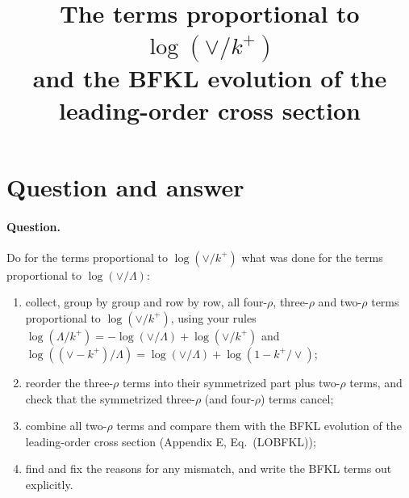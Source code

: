 \documentclass[10pt]{article}
\title{The terms proportional to $\log(\vee/k^+)$\\[2pt] \large and the BFKL evolution of the leading-order cross section}
\date{}
\numberwithin{equation}{section}
\begin{document}
\maketitle
\tableofcontents

\section{Question and answer}\label{sec:answer}

\paragraph{Question.} Do for the terms proportional to $\log(\vee/k^+)$ what was done for the terms proportional to $\log(\vee/\Lambda)$:
\begin{enumerate}
\item collect, group by group and row by row, all four-$\rho$, three-$\rho$ and two-$\rho$ terms proportional to $\log(\vee/k^+)$, using your rules $\log(\Lambda/k^+)=-\log(\vee/\Lambda)+\log(\vee/k^+)$ and $\log((\vee-k^+)/\Lambda)=\log(\vee/\Lambda)+\log(1-k^+/\vee)$;
\item reorder the three-$\rho$ terms into their symmetrized part plus two-$\rho$ terms, and check that the symmetrized three-$\rho$ (and four-$\rho$) terms cancel;
\item combine all two-$\rho$ terms and compare them with the BFKL evolution of the leading-order cross section (Appendix E, Eq.~(LOBFKL));
\item find and fix the reasons for any mismatch, and write the BFKL terms out explicitly.
\end{enumerate}
\end{document}
